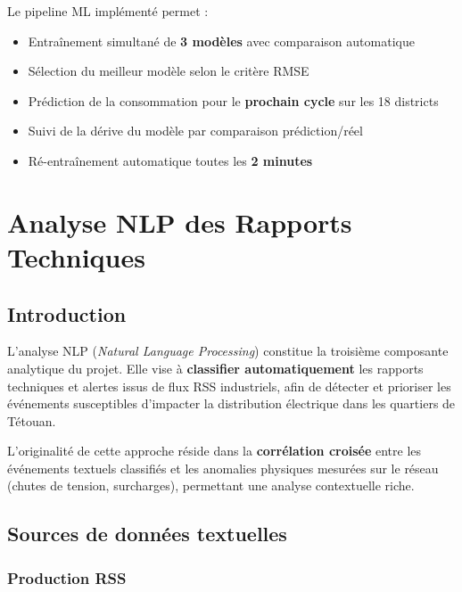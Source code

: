 \documentclass[1pt,a4paper]{report}
\begin{document}
\begin{resultbox}
Le pipeline ML impl\'{e}ment\'{e} permet :
\begin{itemize}[noitemsep]
  \item Entra\^{i}nement simultan\'{e} de \textbf{3 mod\`{e}les} avec comparaison automatique
  \item S\'{e}lection du meilleur mod\`{e}le selon le crit\`{e}re RMSE
  \item Pr\'{e}diction de la consommation pour le \textbf{prochain cycle} sur les 18 districts
  \item Suivi de la d\'{e}rive du mod\`{e}le par comparaison pr\'{e}diction/r\'{e}el
  \item R\'{e}-entra\^{i}nement automatique toutes les \textbf{2 minutes}
\end{itemize}
\end{resultbox}

\chapter{Analyse NLP des Rapports Techniques}
\label{chap:nlp}

\section{Introduction}

L'analyse NLP (\textit{Natural Language Processing}) constitue la troisi\`{e}me composante analytique du projet. Elle vise \`{a} \textbf{classifier automatiquement} les rapports techniques et alertes issus de flux RSS industriels, afin de d\'{e}tecter et prioriser les \'{e}v\'{e}nements susceptibles d'impacter la distribution \'{e}lectrique dans les quartiers de T\'{e}touan.

L'originalit\'{e} de cette approche r\'{e}side dans la \textbf{corr\'{e}lation crois\'{e}e} entre les \'{e}v\'{e}nements textuels classifi\'{e}s et les anomalies physiques mesur\'{e}es sur le r\'{e}seau (chutes de tension, surcharges), permettant une analyse contextuelle riche.

\section{Sources de donn\'{e}es textuelles}

\subsection{Production RSS}
\end{document}
